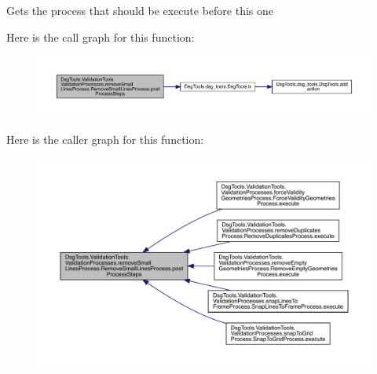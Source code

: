 \begin{DoxyVerb}Gets the process that should be execute before this one
\end{DoxyVerb}
 Here is the call graph for this function\+:
\nopagebreak
\begin{figure}[H]
\begin{center}
\leavevmode
\includegraphics[width=350pt]{class_dsg_tools_1_1_validation_tools_1_1_validation_processes_1_1remove_small_lines_process_1_1_remove_small_lines_process_a68919490a096b3c753a63e9497ee72d2_cgraph}
\end{center}
\end{figure}
Here is the caller graph for this function\+:
\nopagebreak
\begin{figure}[H]
\begin{center}
\leavevmode
\includegraphics[width=350pt]{class_dsg_tools_1_1_validation_tools_1_1_validation_processes_1_1remove_small_lines_process_1_1_remove_small_lines_process_a68919490a096b3c753a63e9497ee72d2_icgraph}
\end{center}
\end{figure}
\mbox{\label{class_dsg_tools_1_1_validation_tools_1_1_validation_processes_1_1remove_small_lines_process_1_1_remove_small_lines_process_afa39dbf71d0204049a936d28af5de1c3}} 
